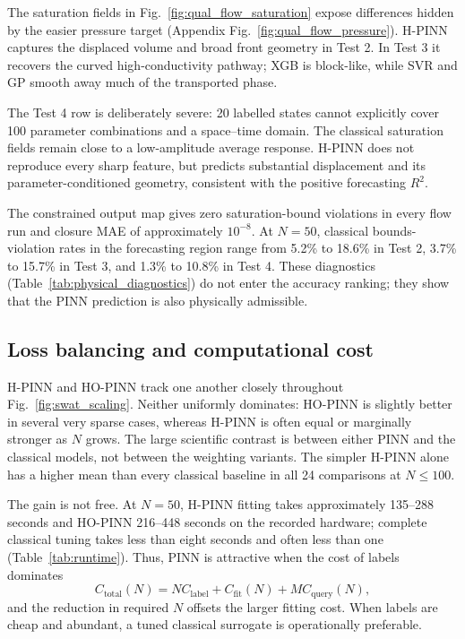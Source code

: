 The saturation fields in Fig.~\ref{fig:qual_flow_saturation} expose differences hidden by the easier pressure target (Appendix Fig.~\ref{fig:qual_flow_pressure}). H-PINN captures the displaced volume and broad front geometry in Test 2. In Test 3 it recovers the curved high-conductivity pathway; XGB is block-like, while SVR and GP smooth away much of the transported phase.

The Test 4 row is deliberately severe: 20 labelled states cannot explicitly cover 100 parameter combinations and a space--time domain. The classical saturation fields remain close to a low-amplitude average response. H-PINN does not reproduce every sharp feature, but predicts substantial displacement and its parameter-conditioned geometry, consistent with the positive forecasting \(R^2\).

The constrained output map gives zero saturation-bound violations in every flow run and closure MAE of approximately \(10^{-8}\). At \(N=50\), classical bounds-violation rates in the forecasting region range from 5.2\% to 18.6\% in Test 2, 3.7\% to 15.7\% in Test 3, and 1.3\% to 10.8\% in Test 4. These diagnostics (Table~\ref{tab:physical_diagnostics}) do not enter the accuracy ranking; they show that the PINN prediction is also physically admissible.

\subsection{Loss balancing and computational cost}

H-PINN and HO-PINN track one another closely throughout Fig.~\ref{fig:swat_scaling}. Neither uniformly dominates: HO-PINN is slightly better in several very sparse cases, whereas H-PINN is often equal or marginally stronger as \(N\) grows. The large scientific contrast is between either PINN and the classical models, not between the weighting variants. The simpler H-PINN alone has a higher mean than every classical baseline in all 24 comparisons at \(N\le100\).

The gain is not free. At \(N=50\), H-PINN fitting takes approximately 135--288 seconds and HO-PINN 216--448 seconds on the recorded hardware; complete classical tuning takes less than eight seconds and often less than one (Table~\ref{tab:runtime}). Thus, PINN is attractive when the cost of labels dominates
\begin{equation}
    C_{\mathrm{total}}(N)
    =N C_{\mathrm{label}}+C_{\mathrm{fit}}(N)+M C_{\mathrm{query}}(N),
\end{equation}
and the reduction in required \(N\) offsets the larger fitting cost. When labels are cheap and abundant, a tuned classical surrogate is operationally preferable.
